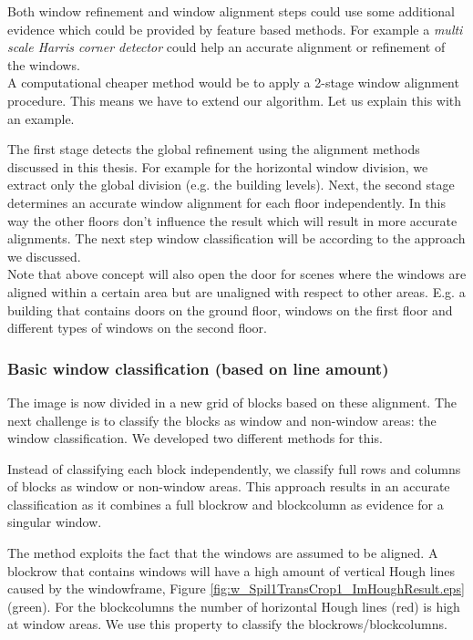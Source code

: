 Both window refinement and window alignment steps could use some additional
evidence which could be provided by feature based methods.  For example a
\emph{multi scale Harris corner detector} could help an accurate alignment or
refinement of the windows.\\

A computational cheaper method would be to apply a 2-stage window alignment
procedure. This means we have to extend our algorithm.  Let us explain this with
an example. 

The first stage detects the global refinement using the alignment
methods discussed in this thesis. For example for the horizontal window
division, we extract only the global division (e.g. the building levels).  Next, 
the second stage determines an accurate window alignment for each floor
independently.  In this way the other floors don't influence the result which will
result in more accurate alignments.  The next step window classification will be
according to the approach we discussed.\\

Note that above concept will also open the door for scenes where the windows are
aligned within a certain area but are unaligned with respect to other areas.
E.g. a building that contains doors on the ground floor, windows on the first
floor and different types of windows on the second floor.




\subsubsection{Basic window classification (based on line amount)}
The image is now divided in a new grid of blocks based on these
alignment. The next challenge is to classify the blocks as window and
non-window areas: the window classification. We developed two different methods for this.

Instead of classifying each block independently, we classify full rows and
columns of blocks as window or non-window areas.  This approach results in an accurate
classification as it combines a full blockrow and blockcolumn as evidence for a singular
window. 

The method exploits the fact that the windows are assumed to be
aligned.
A blockrow that contains windows will have a high amount of vertical
Hough lines caused by the windowframe, Figure \ref{fig:w_Spil1TransCrop1_ImHoughResult.eps}
(green). For the blockcolumns the number of horizontal Hough lines
 (red) is high at window areas.  We use this property to classify 
 the blockrows/blockcolumns. 

